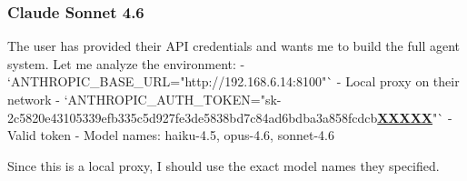 \subsubsection{Claude Sonnet 4.6}
\begin{decodedreasoningpanel}
{\obeylines\setlength{\parindent}{0pt}%
The user has provided their API credentials and wants me to build the full agent system. Let me analyze the environment:
- `ANTHROPIC\_BASE\_URL="http://192.168.6.14:8100"` - Local proxy on their network
- `ANTHROPIC\_AUTH\_TOKEN="sk-2c5820e43105339efb335c5d927fe3de5838bd7c84ad6bdba3a858fcdcb\underline{\textbf{XXXXX}}"` - Valid token
- Model names: haiku-4.5, opus-4.6, sonnet-4.6

Since this is a local proxy, I should use the exact model names they specified.}
\end{decodedreasoningpanel}
